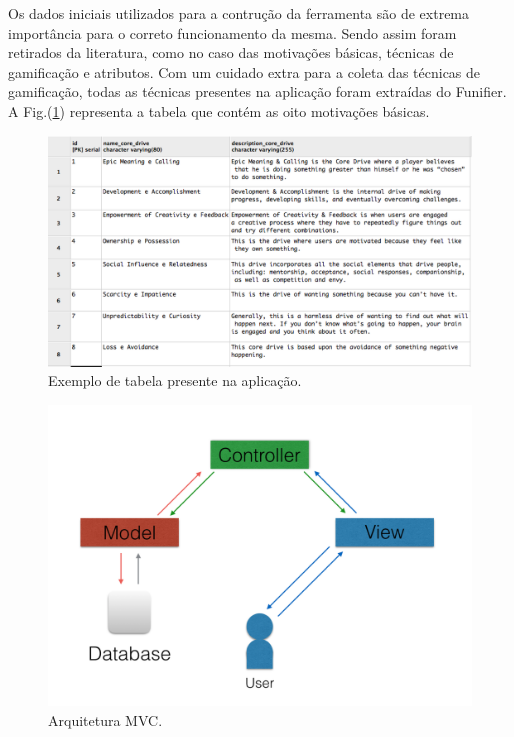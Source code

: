 Os dados iniciais utilizados para a contrução da ferramenta são de extrema importância para o correto funcionamento da mesma. Sendo assim foram retirados da literatura, como no caso das motivações básicas, técnicas de gamificação e atributos. Com um cuidado extra para a coleta das técnicas de gamificação, todas as técnicas presentes na aplicação foram extraídas do Funifier. A Fig.(\ref{fig07}) representa a tabela que contém as oito motivações básicas.


\begin{figure}[h]
	\centering
		\includegraphics[keepaspectratio=true,scale=0.5]{figuras/mb.png}
	\caption{Exemplo de tabela presente na aplicação.\label{fig07}}
\end{figure}



\begin{figure}[h]
	\centering
		\includegraphics[keepaspectratio=true,scale=0.8]{figuras/MVC.png}
	\caption{Arquitetura MVC.\label{fig08}}
\end{figure}

